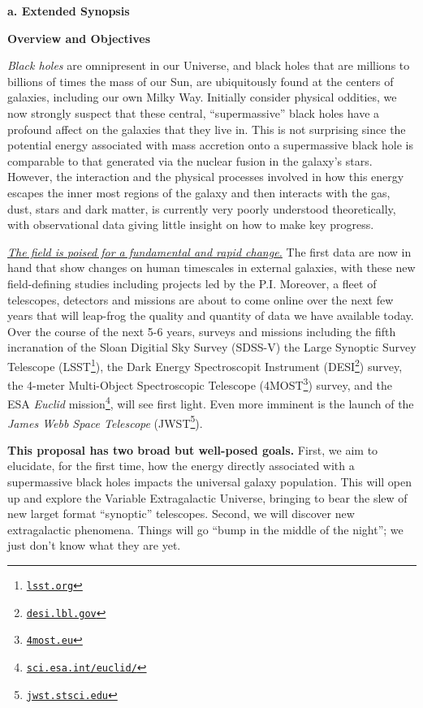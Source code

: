 \documentclass[oneside, a4paper, onecolumn, 11pt]{article}
\begin{document}
\smallskip
\smallskip
\noindent
{\bf{\textcolor{Cerulean}{a. Extended Synopsis}}} 

\noindent
\large
{\bf{\textcolor{Cerulean}{Overview and Objectives}}}
\normalsize


\smallskip
\smallskip
\noindent
{\it Black holes} are omnipresent in our Universe, and black holes
that are millions to billions of times the mass of our Sun, are
ubiquitously found at the centers of galaxies, including our own Milky
Way.  Initially consider physical oddities, we now strongly suspect
that these central, ``supermassive'' black holes have a profound
affect on the galaxies that they live in. This is not surprising since
the potential energy associated with mass accretion onto a
supermassive black hole is comparable to that generated via the
nuclear fusion in the galaxy's stars.
However, the interaction and the physical processes involved in how
this energy escapes the inner most regions of the galaxy and then
interacts with the gas, dust, stars and dark matter, is currently very
poorly understood theoretically, with observational data giving little
insight on how to make key progress.


\smallskip
\smallskip
\noindent
\underline{{\it The field is poised for a fundamental and rapid
change.}} The first data are now in hand that show changes on human
timescales in external galaxies, with these new field-defining studies
including projects led by the P.I.  Moreover, a fleet of telescopes,
detectors and missions are about to come online over the next few
years that will leap-frog the quality and quantity of data we have
available today. Over the course of the next 5-6 years, surveys and
missions including 
the fifth incranation of the Sloan Digitial Sky Survey (SDSS-V) 
the Large Synoptic Survey Telescope (LSST\footnote{\href{lsst.org}{{\tt lsst.org}}}), 
the Dark Energy Spectroscopit Instrument (DESI\footnote{\href{desi.lbl.gov}{{\tt desi.lbl.gov}}}) survey, 
the 4-meter Multi-Object Spectroscopic Telescope (4MOST\footnote{\href{4most.eu}{{\tt 4most.eu}}}) survey, 
and the ESA {\it Euclid} mission\footnote{\href{sci.esa.int/euclid/}{{\tt sci.esa.int/euclid/}}}, 
will see first light. Even more imminent is the launch of the 
{\it James Webb Space Telescope} (JWST\footnote{\href{jwst.stsci.edu}{{\tt jwst.stsci.edu}}}). 

\smallskip
\smallskip
\noindent
{\bf This proposal has two broad but well-posed goals.}
First, we aim to elucidate, for the first time, how the energy
directly associated with a supermassive black holes impacts the
universal galaxy population.  This will open up and explore the
Variable Extragalactic Universe, bringing to bear the slew of new
larget format ``synoptic'' telescopes.
Second, we will discover new extragalactic phenomena. 
Things will go ``bump in the middle of the night''; we
just don't know what they are yet. 
\end{document}
